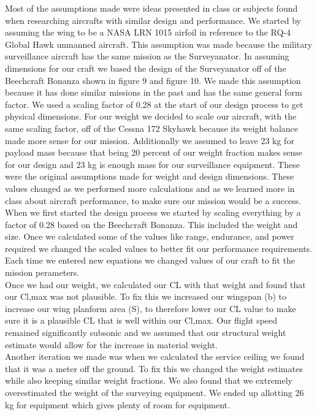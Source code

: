 \documentclass[12pt,A4paper]{article}
\begin{document}
	\hspace{.15 in} Most of the assumptions made were ideas presented in class or subjects found when researching aircrafts with similar design and performance. We started by assuming the wing to be a NASA LRN 1015 airfoil in reference to the RQ-4 Global Hawk unmanned aircraft. This assumption was made because the military surveillance aircraft has the same mission as the Surveyanator. In assuming dimensions for our craft we based the design of the Surveyanator off of the Beechcraft Bonanza shown in figure 9 and figure 10. We made this assumption because it has done similar missions in the past and has the same general form factor. We used a scaling factor of 0.28 at the start of our design process to get physical dimensions. For our weight we decided to scale our aircraft, with the same scaling factor, off of the Cessna 172 Skyhawk because its weight balance made more sense for our mission. Additionally we assumed to leave 23 kg for payload mass because that being 20 percent of our weight fraction makes   sense for our design and 23 kg is enough mass for our surveillance equipment. These were the original assumptions made for weight and design dimensions. These values changed as we performed more calculations and as we learned more in class about aircraft performance, to make sure our mission would be a success. \\
	\indent When we first started the design process we started by scaling everything by a factor of 0.28 based on the Beechcraft Bonanza. This included the weight and size. Once we calculated some of the values like range, endurance, and power required we changed the scaled values to better fit our performance requirements. Each time we entered new equations we changed values of our craft to fit the mission perameters. \\
	\indent Once we had our weight, we calculated our CL with that weight and found that our Cl,max was not plausible. To fix this we increased our wingspan (b) to increase our wing planform area (S), to therefore lower our CL value to make sure it is a plausible CL that is well within our Cl,max. Our flight speed remained significantly subsonic and we assumed that our structural weight estimate would allow for the increase in material weight. \\
	\indent Another iteration we made was when we calculated the service ceiling we found that it was a meter off the ground. To fix this we changed the weight estimates while also keeping similar weight fractions. We also found that we extremely overestimated the weight of the surveying equipment. We ended up allotting 26 kg for equipment which gives plenty of room for equipment. \\
\end{document}
